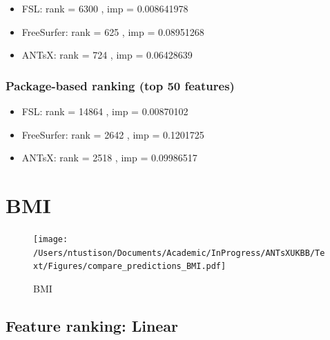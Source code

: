 \documentclass[
  10pt,
]{article}
\begin{document}
\begin{itemize}
\item
  FSL: rank = 6300 , imp = 0.008641978
\item
  FreeSurfer: rank = 625 , imp = 0.08951268
\item
  ANTsX: rank = 724 , imp = 0.06428639
\end{itemize}

\hypertarget{package-based-ranking-top-50-features-3}{%
\subsubsection{Package-based ranking (top 50
features)}\label{package-based-ranking-top-50-features-3}}

\begin{itemize}
\item
  FSL: rank = 14864 , imp = 0.00870102
\item
  FreeSurfer: rank = 2642 , imp = 0.1201725
\item
  ANTsX: rank = 2518 , imp = 0.09986517
\end{itemize}

\clearpage

\hypertarget{bmi}{%
\section{BMI}\label{bmi}}

\begin{figure}
\centering
\texttt{[image: /Users/ntustison/Documents/Academic/InProgress/ANTsXUKBB/Text/Figures/compare\_predictions\_BMI.pdf]}
\caption{BMI}
\end{figure}

\hypertarget{feature-ranking-linear-2}{%
\subsection{Feature ranking: Linear}\label{feature-ranking-linear-2}}
\end{document}
